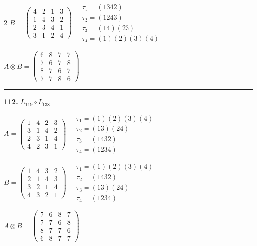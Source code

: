\begin{multicols}{2}
$B = \begin{pmatrix} 4 & 2 & 1 & 3 \\ 1 & 4 & 3 & 2 \\ 2 & 3 & 4 & 1 \\ 3 & 1 & 2 & 4 \end{pmatrix} \quad \begin{matrix} \tau_{1}=(1 3 4 2) \\ \tau_{2}=(1 2 4 3) \\ \tau_{3}=(1 4)(2 3) \\ \tau_{4}=(1)(2)(3)(4) \end{matrix}$

$A \otimes B = \begin{pmatrix} 6 & 8 & 7 & 7 \\ 7 & 6 & 7 & 8 \\ 8 & 7 & 6 & 7 \\ 7 & 7 & 8 & 6 \end{pmatrix}$

\vspace{0.3em}
\hrule
\vspace{0.3em}

\noindent\textbf{112.} $L_{119} \circ L_{138}$

$A = \begin{pmatrix} 1 & 4 & 2 & 3 \\ 3 & 1 & 4 & 2 \\ 2 & 3 & 1 & 4 \\ 4 & 2 & 3 & 1 \end{pmatrix} \quad \begin{matrix} \tau_{1}=(1)(2)(3)(4) \\ \tau_{2}=(1 3)(2 4) \\ \tau_{3}=(1 4 3 2) \\ \tau_{4}=(1 2 3 4) \end{matrix}$

$B = \begin{pmatrix} 1 & 4 & 3 & 2 \\ 2 & 1 & 4 & 3 \\ 3 & 2 & 1 & 4 \\ 4 & 3 & 2 & 1 \end{pmatrix} \quad \begin{matrix} \tau_{1}=(1)(2)(3)(4) \\ \tau_{2}=(1 4 3 2) \\ \tau_{3}=(1 3)(2 4) \\ \tau_{4}=(1 2 3 4) \end{matrix}$

$A \otimes B = \begin{pmatrix} 7 & 6 & 8 & 7 \\ 7 & 7 & 6 & 8 \\ 8 & 7 & 7 & 6 \\ 6 & 8 & 7 & 7 \end{pmatrix}$


\end{multicols}
